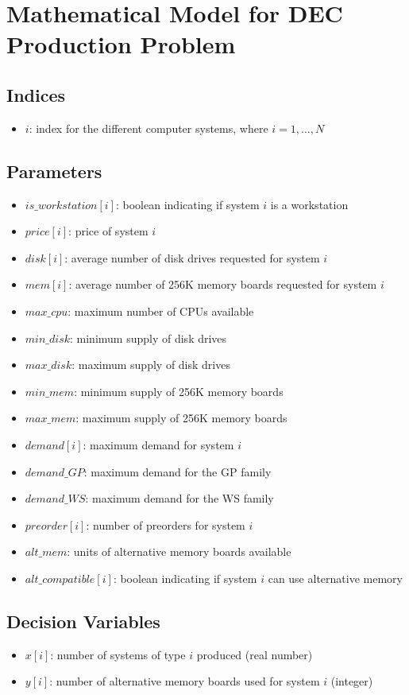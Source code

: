 \documentclass{article}
\begin{document}
\section*{Mathematical Model for DEC Production Problem}

\subsection*{Indices}
\begin{itemize}
    \item $i$: index for the different computer systems, where $i = 1, \dots, N$
\end{itemize}

\subsection*{Parameters}
\begin{itemize}
    \item $is\_workstation[i]$: boolean indicating if system $i$ is a workstation
    \item $price[i]$: price of system $i$
    \item $disk[i]$: average number of disk drives requested for system $i$
    \item $mem[i]$: average number of 256K memory boards requested for system $i$
    \item $max\_cpu$: maximum number of CPUs available
    \item $min\_disk$: minimum supply of disk drives
    \item $max\_disk$: maximum supply of disk drives
    \item $min\_mem$: minimum supply of 256K memory boards
    \item $max\_mem$: maximum supply of 256K memory boards
    \item $demand[i]$: maximum demand for system $i$
    \item $demand\_GP$: maximum demand for the GP family
    \item $demand\_WS$: maximum demand for the WS family
    \item $preorder[i]$: number of preorders for system $i$
    \item $alt\_mem$: units of alternative memory boards available
    \item $alt\_compatible[i]$: boolean indicating if system $i$ can use alternative memory
\end{itemize}

\subsection*{Decision Variables}
\begin{itemize}
    \item $x[i]$: number of systems of type $i$ produced (real number)
    \item $y[i]$: number of alternative memory boards used for system $i$ (integer)
\end{itemize}
\end{document}
